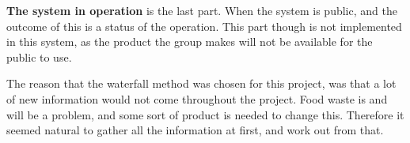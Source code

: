\textbf{The system in operation} is the last part. When the system is public, and the outcome of this is a status of the operation. This part though is not implemented in this system, as the product the group makes will not be available for the public to use.

The reason that the waterfall method was chosen for this project, was that a lot of new information would not come throughout the project. Food waste is and will be a problem, and some sort of product is needed to change this. Therefore it seemed natural to gather all the information at first, and work out from that.